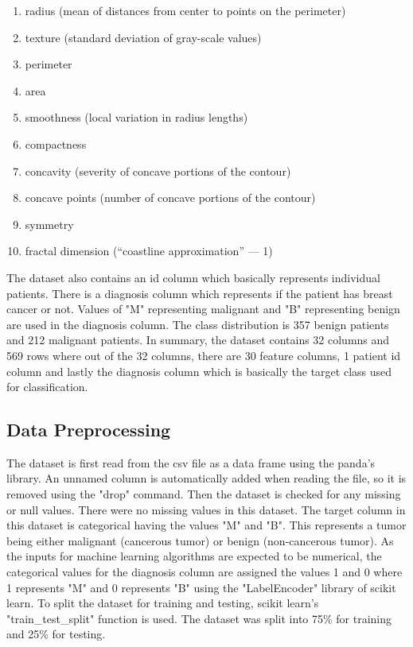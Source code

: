 \documentclass[journal]{IEEEtran}
\begin{document}
\begin{enumerate}
  \item radius (mean of distances from center to points on the perimeter)
  \item texture (standard deviation of gray-scale values)
  \item perimeter
  \item area
  \item smoothness (local variation in radius lengths)
  \item compactness 
  \item concavity (severity of concave portions of the contour)
  \item concave points (number of concave portions of the contour)
  \item symmetry
  \item fractal dimension (“coastline approximation” — 1)\\
\end{enumerate} 

The dataset also contains an id column which basically represents individual patients. There is a diagnosis column which represents if the patient has breast cancer or not. Values of "M" representing malignant and "B" representing benign are used in the diagnosis column. The class distribution is 357 benign patients and 212 malignant patients. In summary, the dataset contains 32 columns and 569 rows where out of the 32 columns, there are 30 feature columns, 1 patient id column and lastly the diagnosis column which is basically the target class used for classification.
 
\subsection{Data Preprocessing}

The dataset is first read from the csv file as a data frame using the panda's library. An unnamed column is automatically added when reading the file, so it is removed using the "drop" command. Then the dataset is checked for any missing or null values. There were no missing values in this dataset. The target column in this dataset is categorical having the values "M" and "B". This represents a tumor being either malignant (cancerous tumor) or benign (non-cancerous tumor). As the inputs for machine learning algorithms are expected to be numerical, the categorical values for the diagnosis column are assigned the values 1 and 0 where 1 represents "M" and 0 represents "B" using the "LabelEncoder" library of scikit learn. To split the dataset for training and testing, scikit learn's "train\_test\_split" function is used. The dataset was split into 75\% for training and 25\% for testing.\\
\end{document}
